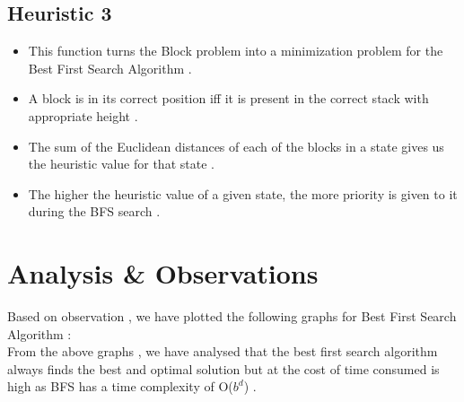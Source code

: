 \documentclass{article}
\begin{document}
\subsection{Heuristic 3}
\begin{itemize}
    \item This function turns the Block problem into a minimization problem for the Best First Search Algorithm .
    \item A block is in its correct position iff it is present in the correct stack with appropriate height .  
    \item The sum of the Euclidean distances of each of the blocks in a state gives us the heuristic value for that state .
    \item The higher the heuristic value of a given state, the more priority is given to it during the BFS search .
\end{itemize}
\newpage
\section{Analysis \& Observations}
\vspace{5pt}
Based on observation , we have plotted the following graphs for Best First Search Algorithm :
\vspace{5pt}
\\From the above graphs , we have analysed that the best first search algorithm always finds the best and optimal solution
but at the cost of time consumed is high as BFS has a time complexity of O($b^d$) .
\newpage
\end{document}

